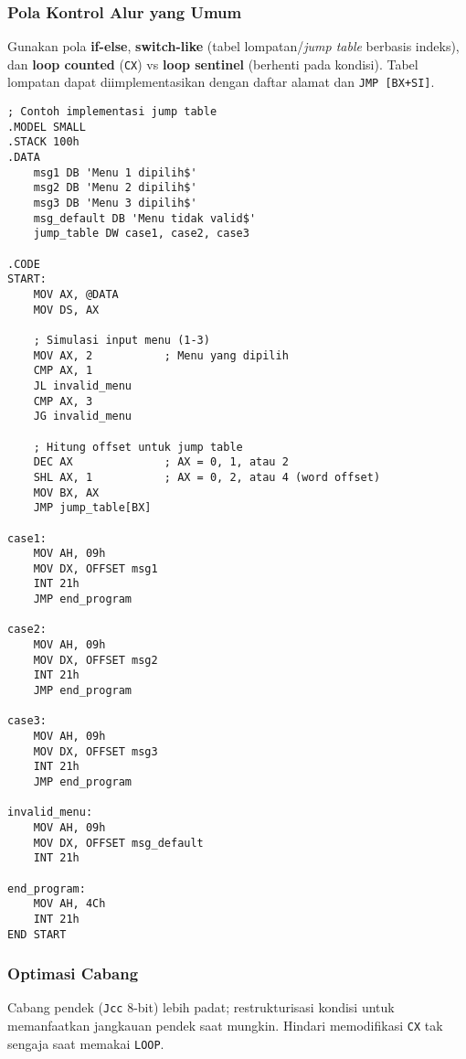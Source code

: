 \documentclass[../main.tex]{subfiles}
\begin{document}
\subsubsection{Pola Kontrol Alur yang Umum}
Gunakan pola \textbf{if-else}, \textbf{switch-like} (tabel lompatan/\textit{jump table} berbasis indeks), dan \textbf{loop counted} (\texttt{CX}) vs \textbf{loop sentinel} (berhenti pada kondisi). Tabel lompatan dapat diimplementasikan dengan daftar alamat dan \texttt{JMP [BX+SI]}. 

\begin{lstlisting}[language={[x86masm]Assembler}, caption=Contoh Jump Table (Switch-like), label={lst:jump-table}]
; Contoh implementasi jump table
.MODEL SMALL
.STACK 100h
.DATA
    msg1 DB 'Menu 1 dipilih$'
    msg2 DB 'Menu 2 dipilih$'
    msg3 DB 'Menu 3 dipilih$'
    msg_default DB 'Menu tidak valid$'
    jump_table DW case1, case2, case3
    
.CODE
START:
    MOV AX, @DATA
    MOV DS, AX
    
    ; Simulasi input menu (1-3)
    MOV AX, 2           ; Menu yang dipilih
    CMP AX, 1
    JL invalid_menu
    CMP AX, 3
    JG invalid_menu
    
    ; Hitung offset untuk jump table
    DEC AX              ; AX = 0, 1, atau 2
    SHL AX, 1           ; AX = 0, 2, atau 4 (word offset)
    MOV BX, AX
    JMP jump_table[BX]
    
case1:
    MOV AH, 09h
    MOV DX, OFFSET msg1
    INT 21h
    JMP end_program
    
case2:
    MOV AH, 09h
    MOV DX, OFFSET msg2
    INT 21h
    JMP end_program
    
case3:
    MOV AH, 09h
    MOV DX, OFFSET msg3
    INT 21h
    JMP end_program
    
invalid_menu:
    MOV AH, 09h
    MOV DX, OFFSET msg_default
    INT 21h
    
end_program:
    MOV AH, 4Ch
    INT 21h
END START
\end{lstlisting}

\subsubsection{Optimasi Cabang}
Cabang pendek (\texttt{Jcc} 8-bit) lebih padat; restrukturisasi kondisi untuk memanfaatkan jangkauan pendek saat mungkin. Hindari memodifikasi \texttt{CX} tak sengaja saat memakai \texttt{LOOP}. 
\end{document}
